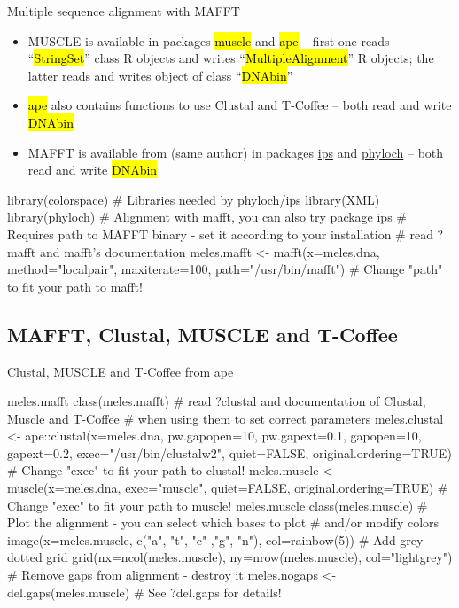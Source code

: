 \documentclass[compress, ucs, xelatex, 11pt, xcolor=svgnames,
  hyperref={
    bookmarks=true,
    unicode=true,
    colorlinks=true,
    pdftitle={Molecular data in R},
    plainpages=false,
    pdfauthor={Vojtech Zeisek},
    pdfsubject={Course about phylogeny and evolution in R},
    pdfcreator={XeLaTeX},
    pdfkeywords={R, evolution, phylogeny, molecular data},
    linkcolor=Tomato,
    anchorcolor=SaddleBrown,
    citecolor=Goldenrod,
    filecolor=DarkMagenta,
    menucolor=Sienna,
    urlcolor=DarkTurquoise,
    pdftex},
  url={hyphens, lowtilde} %
  ]{beamer}
\renewcommand{\texttt}[1]{\hl{\ttfamily #1}}
\begin{document}
\begin{frame}[fragile]{Multiple sequence alignment with MAFFT}
  \begin{itemize}
    \item MUSCLE is available in packages \texttt{muscle} and \texttt{ape} -- first one reads ``\texttt{*StringSet}'' class R objects and writes ``\texttt{*MultipleAlignment}'' R objects; the latter reads and writes object of class ``\texttt{DNAbin}''
    \item \texttt{ape} also contains functions to use Clustal and T-Coffee -- both read and write \texttt{DNAbin}
    \item MAFFT is available from (same author) in packages \href{https://cran.r-project.org/web/packages/ips/index.html}{ips} and \href{http://www.christophheibl.de/Rpackages.html}{phyloch} -- both read and write \texttt{DNAbin}
  \end{itemize}
  \begin{spluscode}
    library(colorspace) # Libraries needed by phyloch/ips
    library(XML)
    library(phyloch) # Alignment with mafft, you can also try package ips
    # Requires path to MAFFT binary - set it according to your installation
    # read ?mafft and mafft's documentation
    meles.mafft <- mafft(x=meles.dna, method="localpair", maxiterate=100,
      path="/usr/bin/mafft") # Change "path" to fit your path to mafft!
  \end{spluscode}
\end{frame}

\subsection{MAFFT, Clustal, MUSCLE and T-Coffee}

\begin{frame}[fragile]{Clustal, MUSCLE and T-Coffee from ape}
  \begin{spluscode}
    meles.mafft
    class(meles.mafft)
    # read ?clustal and documentation of Clustal, Muscle and T-Coffee
    # when using them to set correct parameters
    meles.clustal <- ape::clustal(x=meles.dna, pw.gapopen=10, pw.gapext=0.1,
      gapopen=10, gapext=0.2, exec="/usr/bin/clustalw2", quiet=FALSE,
      original.ordering=TRUE) # Change "exec" to fit your path to clustal!
    meles.muscle <- muscle(x=meles.dna, exec="muscle", quiet=FALSE,
      original.ordering=TRUE) # Change "exec" to fit your path to muscle!
    meles.muscle
    class(meles.muscle)
    # Plot the alignment - you can select which bases to plot
    # and/or modify colors
    image(x=meles.muscle, c("a", "t", "c" ,"g", "n"), col=rainbow(5))
    # Add grey dotted grid
    grid(nx=ncol(meles.muscle), ny=nrow(meles.muscle), col="lightgrey")
    # Remove gaps from alignment - destroy it
    meles.nogaps <- del.gaps(meles.muscle) # See ?del.gaps for details!
  \end{spluscode}
\end{frame}
\end{document}
